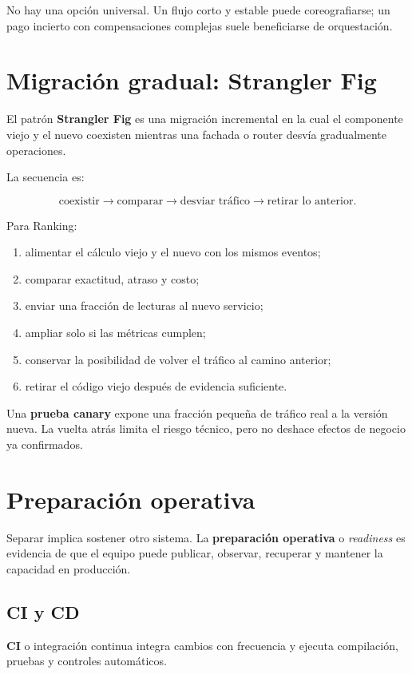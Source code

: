 \documentclass[variant=apuntes,cover=institutional,mode=screen]{ua-engineering-v6-article}
\begin{document}
No hay una opción universal. Un flujo corto y estable puede coreografiarse; un pago incierto con compensaciones complejas suele beneficiarse de orquestación.

\section{Migración gradual: Strangler Fig}

El patrón \textbf{Strangler Fig} es una migración incremental en la cual el componente viejo y el nuevo coexisten mientras una fachada o router desvía gradualmente operaciones.

La secuencia es:

\[
\text{coexistir}\rightarrow\text{comparar}\rightarrow
\text{desviar tráfico}\rightarrow\text{retirar lo anterior}.
\]

Para Ranking:

\begin{enumerate}
\item alimentar el cálculo viejo y el nuevo con los mismos eventos;
\item comparar exactitud, atraso y costo;
\item enviar una fracción de lecturas al nuevo servicio;
\item ampliar solo si las métricas cumplen;
\item conservar la posibilidad de volver el tráfico al camino anterior;
\item retirar el código viejo después de evidencia suficiente.
\end{enumerate}

Una \textbf{prueba canary} expone una fracción pequeña de tráfico real a la versión nueva. La vuelta atrás limita el riesgo técnico, pero no deshace efectos de negocio ya confirmados.

\section{Preparación operativa}

Separar implica sostener otro sistema. La \textbf{preparación operativa} o \emph{readiness} es evidencia de que el equipo puede publicar, observar, recuperar y mantener la capacidad en producción.

\subsection{CI y CD}

\textbf{CI} o integración continua integra cambios con frecuencia y ejecuta compilación, pruebas y controles automáticos.
\end{document}
